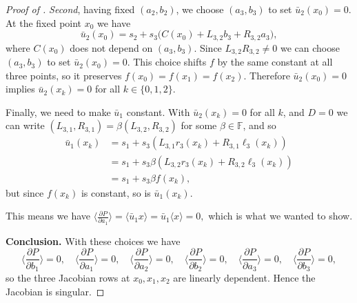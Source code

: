 \begin{proof}[Proof of ]
\emph{Second}, having fixed $(a_2,b_2)$, we choose $(a_3,b_3)$ to set $\bar u_2(x_0)=0$.
At the fixed point $x_0$ we have
\[
   \bar u_2(x_0) = s_2 + s_3\bigl(C(x_0) + L_{3,2} b_3 + R_{3,2} a_3\bigr),
\]
where $C(x_0)$ does not depend on $(a_3,b_3)$.
Since $L_{3,2}R_{3,2}\neq 0$ we can choose $(a_3,b_3)$ to set $\bar u_2(x_0)=0$.
This choice shifts $f$ by the same constant at all three points, so it preserves $f(x_0)=f(x_1)=f(x_2)$.
Therefore $\bar u_2(x_0)=0$ implies $\bar u_2(x_k)=0$ for all $k\in\{0,1,2\}$.

Finally, we need to make $\bar u_1$ constant.
With $\bar u_2(x_k)=0$ for all $k$, and $D=0$ we can write $(L_{3,1},R_{3,1})=\beta(L_{3,2},R_{3,2})$ for some $\beta\in\mathbb{F}$, and so
\begin{align}
   \bar u_1(x_k)
   &= s_1 + s_3 (L_{3,1} r_3(x_k) + R_{3,1} \ell_3(x_k))
 \\&= s_1 + s_3 \beta (L_{3,2} r_3(x_k) + R_{3,2} \ell_3(x_k))
 \\&= s_1 + s_3 \beta f(x_k)
   ,
\end{align}
but since $f(x_k)$ is constant, so is $\bar u_1(x_k)$.

This means we have
\(
   \langle \frac{\partial P}{\partial a_1} \rangle
   = \langle \bar u_1 x \rangle
   = \bar u_1 \langle x \rangle
   = 0,
\)
which is what we wanted to show.

\smallskip
\noindent\textbf{Conclusion.}
With these choices we have
\[
   \Big\langle \frac{\partial P}{\partial b_1}\Big\rangle=0,\quad
   \Big\langle \frac{\partial P}{\partial a_1}\Big\rangle=0,\quad
   \Big\langle \frac{\partial P}{\partial a_2}\Big\rangle=0,\quad
   \Big\langle \frac{\partial P}{\partial b_2}\Big\rangle=0,\quad
   \Big\langle \frac{\partial P}{\partial a_3}\Big\rangle=0,\quad
   \Big\langle \frac{\partial P}{\partial b_3}\Big\rangle=0,
\]
so the three Jacobian rows at $x_0,x_1,x_2$ are linearly dependent. Hence the Jacobian is singular.
\end{proof}

